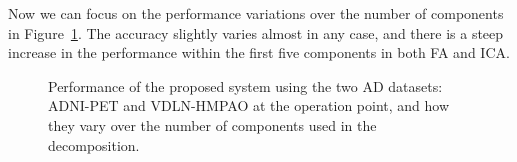 Now we can focus on the performance variations over the number of components in Figure~\ref{fig:accuracyOP-AD}. The accuracy slightly varies almost in any case, and there is a steep increase in the performance within the first five components in both \ac{FA} and \ac{ICA}. 

\begin{figure}
	\centering
	
	
	\caption[Performance at the operation point for the \acs{AD} datasets, over the number of components.]{Performance of the proposed system using the two \ac{AD} datasets: ADNI-PET and VDLN-HMPAO at the operation point, and how they vary over the number of components used in the decomposition. } 
	\label{fig:accuracyOP-AD}
\end{figure}

